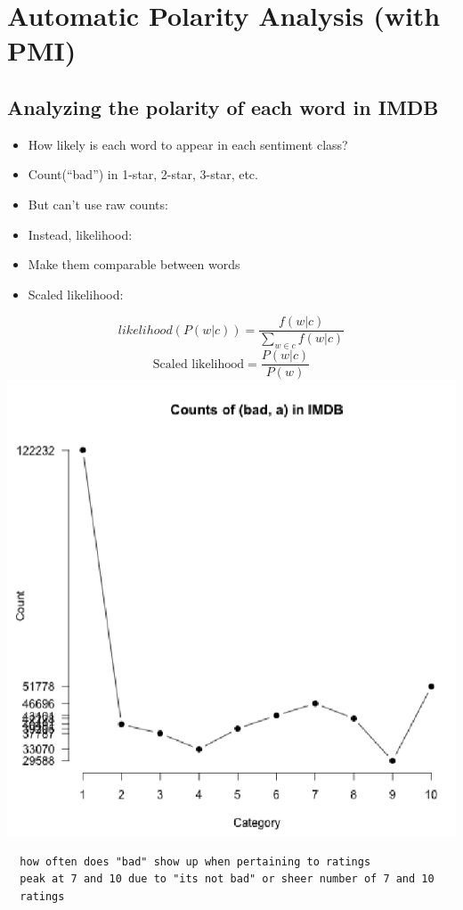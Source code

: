 \documentclass[11pt]{article}
\theoremstyle{definition}
\begin{document}
\section{Automatic Polarity
Analysis (with PMI)}

\subsection{Analyzing the polarity of each word in IMDB}
\begin{itemize}
  \item How likely is each word to appear in each sentiment class?
  \item Count(“bad”) in 1-star, 2-star, 3-star, etc.
  \item But can’t use raw counts:
  \item Instead, likelihood:
  \item Make them comparable between words
  \item Scaled likelihood:
\end{itemize}
\begin{equation}
  likelihood (P(w|c)) = \frac{f(w|c)}{\sum_{w \in c} f(w|c)}
\end{equation}
\begin{equation}
  \text{Scaled likelihood} = \frac{P(w|c)}{P(w)}
\end{equation}
\includegraphics[width=\textwidth/4]{15.png}
\begin{verbatim}
  how often does "bad" show up when pertaining to ratings
  peak at 7 and 10 due to "its not bad" or sheer number of 7 and 10 
  ratings
\end{verbatim}
\end{document}
